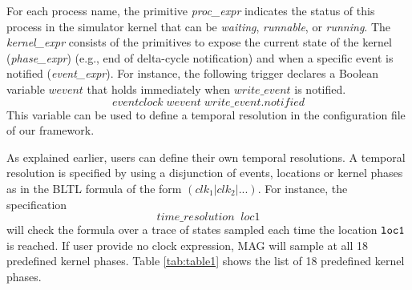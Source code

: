 \documentclass{llncs}
\begin{document}
For each process name, the primitive \textit{proc\_expr} indicates the status of this process in the simulator kernel that can be \textit{waiting}, \textit{runnable}, or \textit{running}. The \textit{kernel\_expr} consists of the primitives to expose the current state of the kernel (\textit{phase\_expr}) (e.g., end of delta-cycle notification) and when a specific event is notified (\textit{event\_expr}). For instance, the following trigger declares a Boolean variable $wevent$ that holds immediately when $write\_event$ is notified.
\begin{displaymath}
eventclock \; wevent \; write\_event.notified
\end{displaymath}
This variable can be used to define a temporal resolution in the configuration file of our framework.

As explained earlier, users can define their own temporal resolutions. A temporal resolution is specified by using a disjunction of events, locations or kernel phases as in the BLTL formula of the form $(clk_1 | clk_2 |...)$. For instance, the specification 
\begin{displaymath}
time\_resolution \; \; loc1
\end{displaymath}
will check the formula over a trace of states sampled each time the location $\begin{tt}loc1\end{tt}$ is reached. If user provide no clock expression, MAG will sample at all 18 predefined kernel phases. Table \ref{tab:table1} shows the list of 18 predefined kernel phases.
\end{document}
